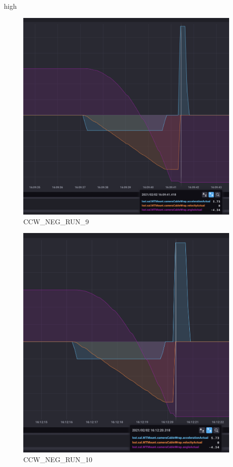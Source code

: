 high\documentclass[SE,lsstdraft,authoryear,toc]{lsstdoc}
\begin{document}
\begin{figure}[h!]
  \includegraphics[width=\linewidth]{media/CCW_design_speed_neg_test9.png}
  \caption{CCW\_NEG\_RUN\_9}
  \label{fig:CCW_NEG_RUN_9}
\end{figure}
\begin{figure}[h!]
  \includegraphics[width=\linewidth]{media/CCW_design_speed_neg_test10.png}
  \caption{CCW\_NEG\_RUN\_10}
  \label{fig:CCW_NEG_RUN_10}
\end{figure}
\end{document}
